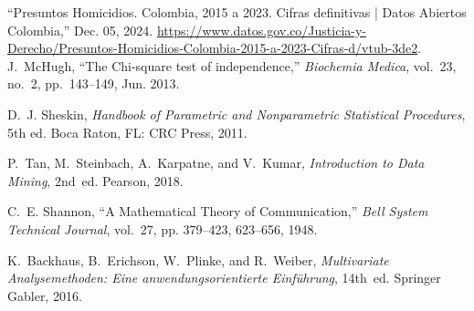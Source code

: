 \documentclass[lettersize,journal]{IEEEtran}
\begin{document}
\begin{thebibliography}{1}


``Presuntos Homicidios. Colombia, 2015 a 2023. Cifras definitivas | Datos Abiertos Colombia,” Dec. 05, 2024. \url{
https://www.datos.gov.co/Justicia-y-Derecho/Presuntos-Homicidios-Colombia-2015-a-2023-Cifras-d/vtub-3de2}.
J.~McHugh, “The Chi-square test of independence,” \emph{Biochemia Medica}, vol.~23, no.~2, pp.~143--149, Jun. 2013.

D.~J. Sheskin, \emph{Handbook of Parametric and Nonparametric Statistical Procedures}, 5th ed. Boca Raton, FL: CRC Press, 2011.

P.~Tan, M.~Steinbach, A.~Karpatne, and V.~Kumar, \emph{Introduction to Data Mining}, 2nd~ed. Pearson, 2018.

C.~E. Shannon, ``A Mathematical Theory of Communication,'' \emph{Bell System Technical Journal}, vol.~27, pp. 379--423, 623--656, 1948.

K.~Backhaus, B.~Erichson, W.~Plinke, and R.~Weiber, \emph{Multivariate Analysemethoden: Eine anwendungsorientierte Einführung}, 14th~ed. Springer Gabler, 2016.


\end{thebibliography}


\newpage



\vfill
\end{document}
